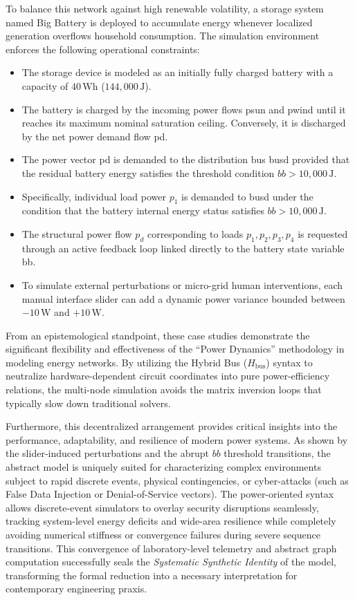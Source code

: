 \documentclass[energies,accept,oneauthor,pdftex]{Definitions/mdpi}
\begin{document}
To balance this network against high renewable volatility, a storage system named \textsf{Big Battery} is deployed to accumulate energy whenever localized generation overflows household consumption. The simulation environment enforces the following operational constraints:
\begin{itemize}
    \item The storage device is modeled as an initially fully charged battery with a capacity of $40\,\text{Wh}$ ($144,000\,\text{J}$).
    \item The battery is charged by the incoming power flows \textsf{psun} and \textsf{pwind} until it reaches its maximum nominal saturation ceiling. Conversely, it is discharged by the net power demand flow \textsf{pd}.
    \item The power vector \textsf{pd} is demanded to the distribution bus \textsf{busd} provided that the residual battery energy satisfies the threshold condition $bb > 10,000\,\text{J}$.
    \item Specifically, individual load power $p_1$ is demanded to \textsf{busd} under the condition that the battery internal energy status satisfies $bb > 10,000\,\text{J}$.
    \item The structural power flow $p_d$ corresponding to loads $p_1, p_2, p_3, p_4$ is requested through an active feedback loop linked directly to the battery state variable \textsf{bb}.
    \item To simulate external perturbations or micro-grid human interventions, each manual interface slider can add a dynamic power variance bounded between $-10\,\text{W}$ and $+10\,\text{W}$.
\end{itemize}

From an epistemological standpoint, these case studies demonstrate the significant flexibility and effectiveness of the ``Power Dynamics'' methodology in modeling energy networks. By utilizing the Hybrid Bus ($H_{\text{bus}}$) syntax to neutralize hardware-dependent circuit coordinates into pure power-efficiency relations, the multi-node simulation avoids the matrix inversion loops that typically slow down traditional solvers.

Furthermore, this decentralized arrangement provides critical insights into the performance, adaptability, and resilience of modern power systems. As shown by the slider-induced perturbations and the abrupt $bb$ threshold transitions, the abstract model is uniquely suited for characterizing complex environments subject to rapid discrete events, physical contingencies, or cyber-attacks (such as False Data Injection or Denial-of-Service vectors). The power-oriented syntax allows discrete-event simulators to overlay security disruptions seamlessly, tracking system-level energy deficits and wide-area resilience while completely avoiding numerical stiffness or convergence failures during severe sequence transitions. This convergence of laboratory-level telemetry and abstract graph computation successfully seals the \textit{Systematic Synthetic Identity} of the model, transforming the formal reduction into a necessary interpretation for contemporary engineering praxis.
\end{document}
